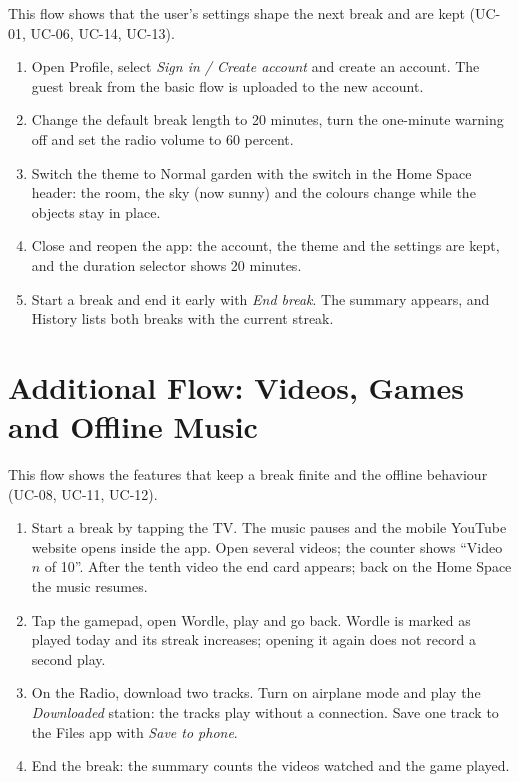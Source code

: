 This flow shows that the user's settings shape the next break and are kept
(UC-01, UC-06, UC-14, UC-13).
\begin{enumerate}[leftmargin=1.8em,itemsep=2pt]
  \item Open Profile, select \textit{Sign in / Create account} and create an
        account. The guest break from the basic flow is uploaded to the new
        account.
  \item Change the default break length to 20 minutes, turn the one-minute
        warning off and set the radio volume to 60 percent.
  \item Switch the theme to Normal garden with the switch in the Home Space
        header: the room, the sky (now sunny) and the colours change while the
        objects stay in place.
  \item Close and reopen the app: the account, the theme and the settings are
        kept, and the duration selector shows 20 minutes.
  \item Start a break and end it early with \textit{End break}. The summary
        appears, and History lists both breaks with the current streak.
\end{enumerate}

\section{Additional Flow: Videos, Games and Offline Music}
\label{sec:additional-flow}

This flow shows the features that keep a break finite and the offline
behaviour (UC-08, UC-11, UC-12).
\begin{enumerate}[leftmargin=1.8em,itemsep=2pt]
  \item Start a break by tapping the TV. The music pauses and the mobile
        YouTube website opens inside the app. Open several videos; the counter
        shows ``Video $n$ of 10''. After the tenth video the end card appears;
        back on the Home Space the music resumes.
  \item Tap the gamepad, open Wordle, play and go back. Wordle is marked as
        played today and its streak increases; opening it again does not
        record a second play.
  \item On the Radio, download two tracks. Turn on airplane mode and play the
        \textit{Downloaded} station: the tracks play without a connection.
        Save one track to the Files app with \textit{Save to phone}.
  \item End the break: the summary counts the videos watched and the game
        played.
\end{enumerate}
